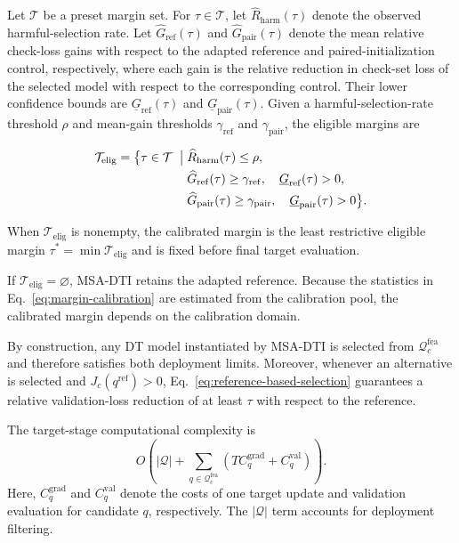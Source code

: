 \documentclass[a4paper,fleqn]{cas-sc}
\begin{document}
Let $\mathcal{T}$ be a preset margin set. For $\tau\in\mathcal{T}$, let
$\widehat R_{\mathrm{harm}}(\tau)$ denote the observed harmful-selection rate.
Let $\widehat G_{\mathrm{ref}}(\tau)$ and
$\widehat G_{\mathrm{pair}}(\tau)$ denote the mean relative check-loss gains
with respect to the adapted reference and paired-initialization control,
respectively, where each gain is the relative reduction in check-set loss of
the selected model with respect to the corresponding control. Their lower
confidence bounds are $\underline G_{\mathrm{ref}}(\tau)$ and
$\underline G_{\mathrm{pair}}(\tau)$. Given a harmful-selection-rate
threshold $\rho$ and mean-gain thresholds $\gamma_{\mathrm{ref}}$ and
$\gamma_{\mathrm{pair}}$, the eligible margins are

\begin{equation}
\begin{aligned}
\mathcal{T}_{\mathrm{elig}}
=
\bigl\{
\tau\in\mathcal{T}
\;\bigm|\;&
\widehat R_{\mathrm{harm}}(\tau)\leq\rho,
\\
&
\widehat G_{\mathrm{ref}}(\tau)\geq\gamma_{\mathrm{ref}},
\quad
\underline G_{\mathrm{ref}}(\tau)>0,
\\
&
\widehat G_{\mathrm{pair}}(\tau)\geq\gamma_{\mathrm{pair}},
\quad
\underline G_{\mathrm{pair}}(\tau)>0
\bigr\}.
\end{aligned}
\label{eq:margin-calibration}
\end{equation}

When $\mathcal{T}_{\mathrm{elig}}$ is nonempty, the calibrated margin is the
least restrictive eligible margin $\tau^*=\min\mathcal{T}_{\mathrm{elig}}$
and is fixed before final target evaluation.

If $\mathcal{T}_{\mathrm{elig}}=\varnothing$, MSA-DTI retains the adapted
reference. Because the statistics in Eq.~\eqref{eq:margin-calibration} are
estimated from the calibration pool, the calibrated margin depends on the
calibration domain.

By construction, any DT model instantiated by MSA-DTI is selected from
$\mathcal{Q}_{c}^{\mathrm{fea}}$ and therefore satisfies both deployment
limits. Moreover, whenever an alternative is selected and
$J_c(q^{\mathrm{ref}})>0$, Eq.~\eqref{eq:reference-based-selection}
guarantees a relative validation-loss reduction of at least $\tau$ with
respect to the reference.

The target-stage computational complexity is
\begin{equation}
O\left(
|\mathcal{Q}|+
\sum_{q\in\mathcal{Q}_{c}^{\mathrm{fea}}}
\left(TC_q^{\mathrm{grad}}+C_q^{\mathrm{val}}\right)
\right).
\label{eq:target-complexity}
\end{equation}
Here, $C_q^{\mathrm{grad}}$ and $C_q^{\mathrm{val}}$ denote the costs of one
target update and validation evaluation for candidate $q$, respectively. The
$|\mathcal{Q}|$ term accounts for deployment filtering.
\end{document}
